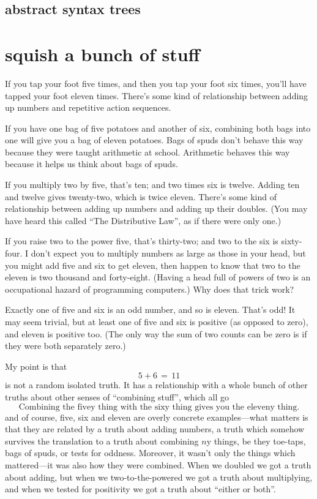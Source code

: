 \documentclass{book}
\begin{document}
\section{abstract syntax trees}


\chapter{squish a bunch of stuff}

If you tap your foot five times, and then you tap your foot six times, you'll have tapped your foot eleven times. There's some kind of relationship between adding up numbers and repetitive action sequences.

If you have one bag of five potatoes and another of six, combining both bags into one will give you a bag of eleven potatoes. Bags of spuds don't behave this way because they were taught arithmetic at school. Arithmetic behaves this way because it helps us think about bags of spuds.

If you multiply two by five, that's ten; and two times six is twelve. Adding ten and twelve gives twenty-two, which is twice eleven. There's some kind of relationship between adding up numbers and adding up their doubles. (You may have heard this called ``The Distributive Law'', as if there were only one.)

If you raise two to the power five, that's thirty-two; and two to the six is sixty-four. I don't expect you to multiply numbers as large as those in your head, but you might add five and six to get eleven, then happen to know that two to the eleven is two thousand and forty-eight. (Having a head full of powers of two is an occupational hazard of programming computers.) Why does that trick work?

Exactly one of five and six is an odd number, and so is eleven. That's odd! It may seem trivial, but at least one of five and six is positive (as opposed to zero), and eleven is positive too. (The only way the sum of two counts can be zero is if they were both separately zero.)

My point is that
\[
5 + 6 \,=\, 11
\]
is not a random isolated truth. It has a relationship with a whole bunch of other truths about other senses of ``combining stuff'', which all go
\[
\mbox{Combining the fivey thing with the sixy thing gives you the eleveny thing.}
\]
and of course, five, six and eleven are overly concrete examples---what matters is that they are related by a truth about adding numbers, a truth which somehow survives the translation to a truth about combining $n$y things, be they toe-taps, bags of spuds, or tests for oddness. Moreover, it wasn't only the things which mattered---it was also how they were combined. When we doubled we got a truth about adding, but when we two-to-the-powered we got a truth about multiplying, and when we tested for positivity we got a truth about ``either or both''.
\end{document}
